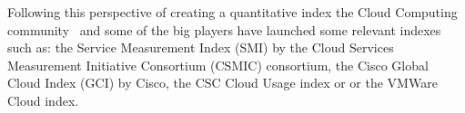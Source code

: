 Following this perspective of creating a quantitative index the Cloud Computing community~\cite{Maiya:2012:QMC:2353730.2353862,DBLP:conf/quatic/KlemsBW12} 
and some of the big players have launched some relevant indexes such as: the Service Measurement Index (SMI) by the Cloud Services 
Measurement Initiative Consortium (CSMIC) consortium, the Cisco Global Cloud Index (GCI) by Cisco, the CSC Cloud Usage index or 
or the VMWare Cloud index.

% 
%  
% 
% 
% 

